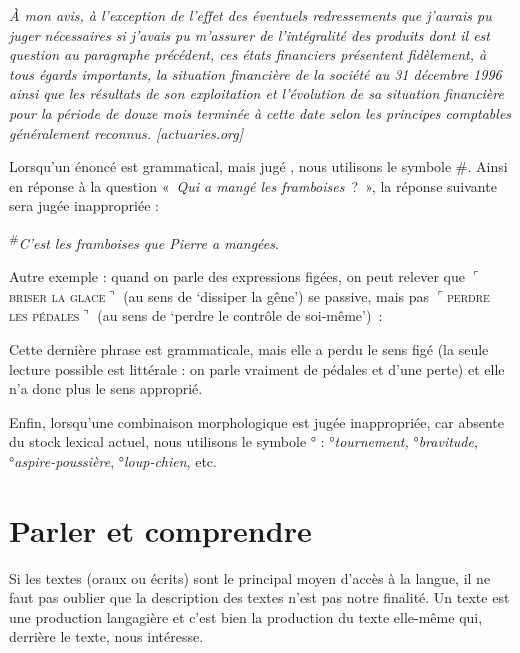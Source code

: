 \ea\itshape
À mon avis, à l’exception de l’effet des éventuels redressements que j’aurais pu juger nécessaires si j’avais pu m’assurer de l’intégralité des produits dont il est question au paragraphe précédent, ces états financiers présentent fidèlement, à tous égards importants, la situation financière de la société au 31 décembre 1996 ainsi que les résultats de son exploitation et l’évolution de sa situation financière pour la période de douze mois terminée à cette date selon les principes comptables généralement reconnus. [actuaries.org]
\z

Lorsqu’un énoncé est grammatical, mais jugé , nous utilisons le symbole \#. Ainsi en réponse à la question «~\textit{Qui a mangé les framboises~}?~», la réponse suivante sera jugée inappropriée :

\ea
\textsuperscript{\#}{\itshape C’est les framboises que Pierre a mangées}.
\z

Autre exemple : quand on parle des expressions figées, on peut relever que $⌜$\textsc{briser} \textsc{la} \textsc{glace}$⌝$ (au sens de ‘dissiper la gêne’) se passive, mais pas $⌜$\textsc{perdre} \textsc{les} \textsc{pédales}$⌝$ (au sens de ‘perdre le contrôle de soi-même’)~:

\ea
\z
\z

Cette dernière phrase est grammaticale, mais elle a perdu le sens figé (la seule lecture possible est littérale : on parle vraiment de pédales et d’une perte) et elle n’a donc plus le sens approprié.

Enfin, lorsqu’une combinaison morphologique est jugée inappropriée, car absente du stock lexical actuel, nous utilisons le symbole ° : °\textit{tournement,} °\textit{bravitude}, °\textit{aspire-poussière}, °\textit{loup-chien}, etc.

\section{Parler et comprendre}\label{sec:1.1.12}

Si les textes (oraux ou écrits) sont le principal moyen d’accès à la langue, il ne faut pas oublier que la description des textes n’est pas notre finalité. Un texte est une production langagière et c’est bien la production du texte elle-même qui, derrière le texte, nous intéresse.

